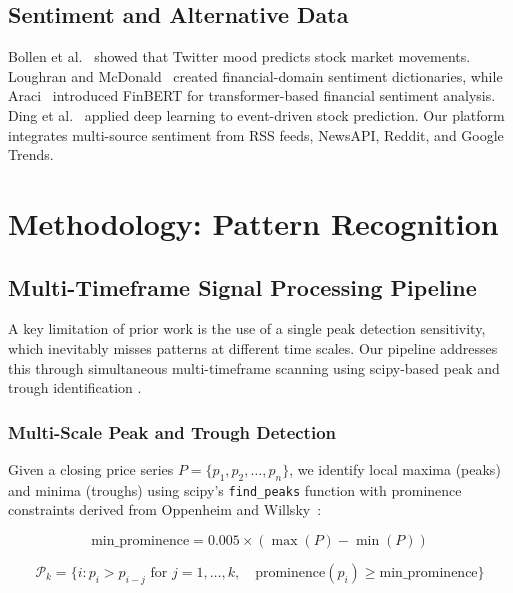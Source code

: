\documentclass[12pt,a4paper]{article}
\begin{document}
\subsection{Sentiment and Alternative Data}

Bollen et al.~\cite{bollen2011twitter} showed that Twitter mood predicts stock market movements. Loughran and McDonald~\cite{loughran2011liability} created financial-domain sentiment dictionaries, while Araci~\cite{araci2019finbert} introduced FinBERT for transformer-based financial sentiment analysis. Ding et al.~\cite{ding2015deep} applied deep learning to event-driven stock prediction. Our platform integrates multi-source sentiment from RSS feeds, NewsAPI, Reddit, and Google Trends.

\section{Methodology: Pattern Recognition}

\subsection{Multi-Timeframe Signal Processing Pipeline}

A key limitation of prior work is the use of a single peak detection sensitivity, which inevitably misses patterns at different time scales. Our pipeline addresses this through simultaneous multi-timeframe scanning using scipy-based peak and trough identification \cite{scipy2020reference}.

\subsubsection{Multi-Scale Peak and Trough Detection}

Given a closing price series $P = \{p_1, p_2, \ldots, p_n\}$, we identify local maxima (peaks) and minima (troughs) using scipy's \texttt{find\_peaks} function with prominence constraints derived from Oppenheim and Willsky~\cite{oppenheim1997signals}:

\begin{equation}
\text{min\_prominence} = 0.005 \times (\max(P) - \min(P))
\end{equation}

\begin{equation}
\mathcal{P}_k = \{i : p_i > p_{i-j} \text{ for } j = 1, \ldots, k, \quad \text{prominence}(p_i) \geq \text{min\_prominence}\}
\end{equation}
\end{document}
